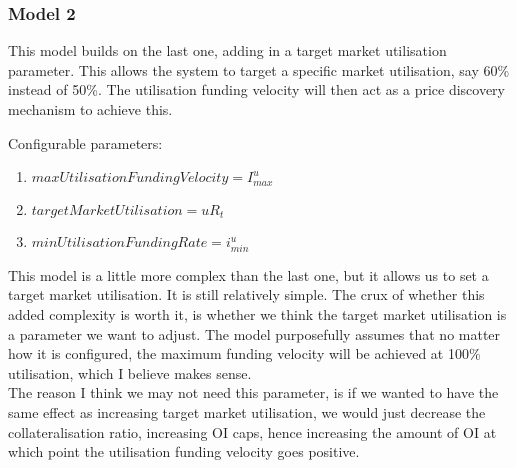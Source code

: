 \documentclass[]{article}
\begin{document}
\subsubsection{Model 2}

This model builds on the last one, adding in a target market utilisation parameter. This allows the system to target a specific market utilisation, say 60\% instead of 50\%. The utilisation funding velocity will then act as a price discovery mechanism to achieve this.

Configurable parameters:
\begin{enumerate}
\item $maxUtilisationFundingVelocity = I^u_{max}$
\item $targetMarketUtilisation = uR_t$
\item $minUtilisationFundingRate = i^u_{min}$
\end{enumerate}


This model is a little more complex than the last one, but it allows us to set a target market utilisation. It is still relatively simple. The crux of whether this added complexity is worth it, is whether we think the target market utilisation is a parameter we want to adjust. The model purposefully assumes that no matter how it is configured, the maximum funding velocity will be achieved at 100\% utilisation, which I believe makes sense.\\

The reason I think we may not need this parameter, is if we wanted to have the same effect as increasing target market utilisation, we would just decrease the collateralisation ratio, increasing OI caps, hence increasing the amount of OI at which point the utilisation funding velocity goes positive.\\
\end{document}
